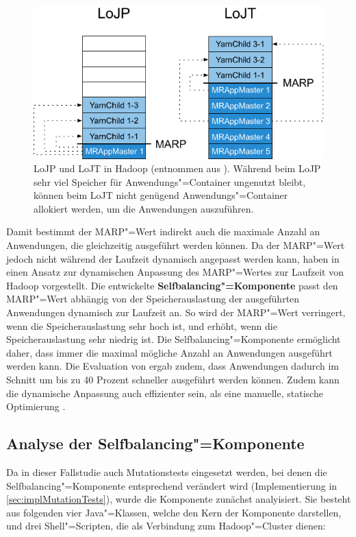 \begin{figure}[h]
    \includegraphics{./images/marpValue.pdf}
    \caption[LoJP und LoJT in Hadoop]
    {LoJP und LoJT in Hadoop (entnommen aus \cite{zhang2016}).
        Während beim LoJP sehr viel Speicher für Anwendungs"=Container ungenutzt bleibt, können beim LoJT nicht genügend Anwendungs"=Container allokiert werden, um die Anwendungen auszuführen.}
    \label{fig:marpValue}
\end{figure}

Damit bestimmt der \ac{MARP}"=Wert indirekt auch die maximale Anzahl an Anwendungen, die gleichzeitig ausgeführt werden können.
Da der \ac{MARP}"=Wert jedoch nicht während der Laufzeit dynamisch angepasst werden kann, haben \citeauthor{zhang2016} in \cite{zhang2016} einen Ansatz zur dynamischen Anpassung des \ac{MARP}"=Wertes zur Laufzeit von Hadoop vorgestellt.
Die entwickelte \textbf{Selfbalancing"=Komponente} passt den \ac{MARP}"=Wert abhängig von der Speicherauslastung der ausgeführten Anwendungen dynamisch zur Laufzeit an.
So wird der \ac{MARP}"=Wert verringert, wenn die Speicherauslastung sehr hoch ist, und erhöht, wenn die Speicherauslastung sehr niedrig ist.
Die Selfbalancing"=Komponente ermöglicht daher, dass immer die maximal mögliche Anzahl an Anwendungen ausgeführt werden kann.
Die Evaluation von \citeauthor{zhang2016} ergab zudem, dass Anwendungen dadurch im Schnitt um bis zu 40 Prozent schneller ausgeführt werden können.
Zudem kann die dynamische Anpassung auch effizienter sein, als eine manuelle, statische Optimierung \cite{zhang2016}.

\subsection{Analyse der Selfbalancing"=Komponente}
\label{subsec:selfbalancingAnalysis}

Da in dieser Fallstudie auch Mutationstests eingesetzt werden, bei denen die Selfbalancing"=Komponente entsprechend verändert wird (Implementierung in \autoref{sec:implMutationTests}), wurde die Komponente zunächst analyisiert.
Sie besteht aus folgenden vier Java"=Klassen, welche den Kern der Komponente darstellen, und drei Shell"=Scripten, die als Verbindung zum Hadoop"=Cluster dienen:


